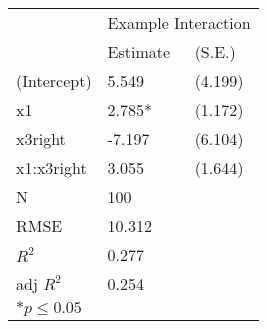 \begin{tabular}{*{3}{l}}
 \hline
                &\multicolumn{2}{c}{Example Interaction}   \\
                &Estimate &(S.E.) \\
 \hline
 \hline
  (Intercept)    &  5.549  &   (4.199) \\
  x1             &  2.785*  &   (1.172) \\
  x3right        & -7.197  &   (6.104) \\
  x1:x3right     &  3.055  &   (1.644) \\
 \hline 
 N                &100      &       \\
 RMSE            &10.312        & \\
 $R^2$           &0.277        & \\
 adj $R^2$       &0.254        & \\
 \hline
 \hline
 
 \multicolumn{2}{l}{${*}  p \le 0.05$   }\\
 \end{tabular}